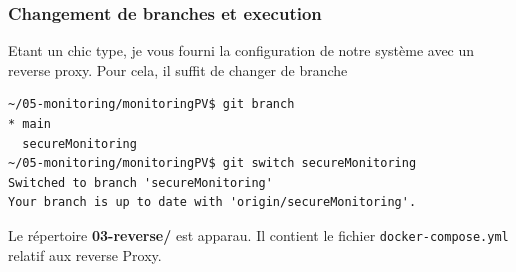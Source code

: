 \documentclass[french, 12pt]{article}%
\begin{document}
\subsubsection{Changement de branches et execution}

Etant un chic type, je vous fourni la configuration de notre système avec un reverse proxy. 
Pour cela, il suffit de changer de branche

\begin{lstlisting}[style=commande] 
~/05-monitoring/monitoringPV$ git branch 
* main
  secureMonitoring
~/05-monitoring/monitoringPV$ git switch secureMonitoring 
Switched to branch 'secureMonitoring'
Your branch is up to date with 'origin/secureMonitoring'.
\end{lstlisting} 

Le répertoire \textbf{03-reverse/} est apparau. Il contient le fichier \verb?docker-compose.yml ? relatif aux reverse Proxy. 
\end{document}
